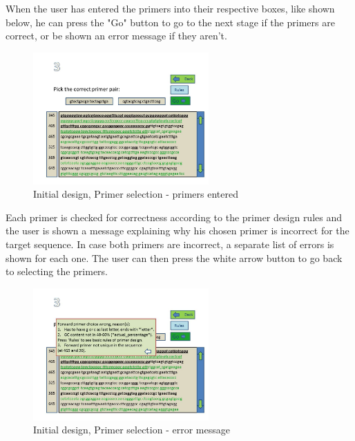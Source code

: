 When the user has entered the primers into their respective boxes, like shown below, he can press the "Go" button to go to the next stage if the primers are correct, or be shown an error message if they aren't.

\begin{figure}[h]
  \begin{center}
	\includegraphics[width=0.6\textwidth]{./images/UiDes/Slide4.JPG}
    \caption{
      \label{fig:UiDes:slide4}
      Initial design, Primer selection - primers entered
    }
  \end{center}
\end{figure}

Each primer is checked for correctness according to the primer design rules and the user is shown a message explaining why his chosen primer is incorrect for the target sequence. In case both primers are incorrect, a separate list of errors is shown for each one. The user can then press the white arrow button to go back to selecting the primers.

\begin{figure}[h]
  \begin{center}
	\includegraphics[width=0.6\textwidth]{./images/UiDes/slide5.jpg}
    \caption{
      \label{fig:UiDes:slide5}
      Initial design, Primer selection - error message
    }
  \end{center}
\end{figure}

